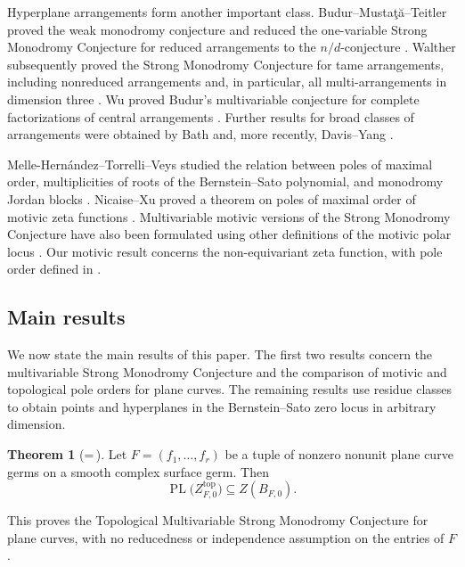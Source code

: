\documentclass[12pt]{amsart}
\numberwithin{equation}{section}
\theoremstyle{plain}
\theoremstyle{definition}
\theoremstyle{remark}
\theoremstyle{definition}
\newtheorem{maintheorem}{Theorem}
\DeclareMathOperator{\PL}{PL}
\begin{document}
Hyperplane arrangements form another important class. Budur--Mustaţă--Teitler proved the weak monodromy conjecture and reduced the one-variable Strong Monodromy Conjecture for reduced arrangements to the $n/d$-conjecture \cite{BMT2011}. Walther subsequently proved the Strong Monodromy Conjecture for tame arrangements, including nonreduced arrangements and, in particular, all multi-arrangements in dimension three \cite[Corollary~5.15 and Remark~5.16]{Walther2017jacobian}. Wu proved Budur's multivariable conjecture for complete factorizations of central arrangements \cite{WuDiagonal2022}. Further results for broad classes of arrangements were obtained by Bath \cite{Bath2023} and, more recently, Davis--Yang \cite{DavisYang2026}.

Melle-Hern\'andez--Torrelli--Veys studied the relation between poles of maximal order, multiplicities of roots of the Bernstein--Sato polynomial, and monodromy Jordan blocks \cite{MelleTorrelliVeys2009}. Nicaise--Xu proved a theorem on poles of maximal order of motivic zeta functions \cite{NicaiseXu2016}. Multivariable motivic versions of the Strong Monodromy Conjecture have also been formulated using other definitions of the motivic polar locus \cite[Conjecture~2.3(ii)]{BvdVWZSurvey2024}. Our motivic result concerns the non-equivariant zeta function, with pole order defined in .


\subsection{Main results}

We now state the main results of this paper. The first two results concern the multivariable Strong Monodromy Conjecture and the comparison of motivic and topological pole orders for plane curves. The remaining results use residue classes to obtain points and hyperplanes in the Bernstein--Sato zero locus in arbitrary dimension.

\begin{maintheorem}[{=\,}]\label{thm:main-intro}
Let $F=(f_1,\ldots,f_r)$ be a tuple of nonzero nonunit plane curve germs on a smooth complex surface germ. Then
\[
\PL\bigl(Z^{\mathrm{top}}_{F,0}\bigr)\subseteq Z(B_{F,0}).
\]
\end{maintheorem}

This proves the Topological Multivariable Strong Monodromy Conjecture for plane curves, with no reducedness or independence assumption on the entries of $F$.
\end{document}
